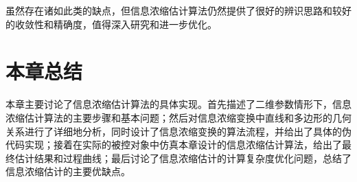 虽然存在诸如此类的缺点，但信息浓缩估计算法仍然提供了很好的辨识思路和较好的收敛性和精确度，值得深入研究和进一步优化。

\section{本章总结}
本章主要讨论了信息浓缩估计算法的具体实现。首先描述了二维参数情形下，信息浓缩估计算法的主要步骤和基本问题；然后对信息浓缩变换中直线和多边形的几何关系进行了详细地分析，同时设计了信息浓缩变换的算法流程，并给出了具体的伪代码实现；接着在实际的被控对象中仿真本章设计的信息浓缩估计算法，给出了最终估计结果和过程曲线；最后讨论了信息浓缩估计的计算复杂度优化问题，总结了信息浓缩估计的主要优缺点。